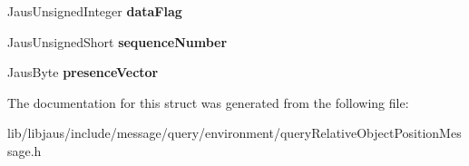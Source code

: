 \begin{DoxyCompactItemize}
\item 
\hypertarget{struct_query_relative_object_position_message_struct_aaec25be55b8853ae277a2967c1438698}{\-Jaus\-Unsigned\-Integer {\bfseries data\-Flag}}\label{struct_query_relative_object_position_message_struct_aaec25be55b8853ae277a2967c1438698}

\item 
\hypertarget{struct_query_relative_object_position_message_struct_ac7a308834dbec50d3d67a217992fe75c}{\-Jaus\-Unsigned\-Short {\bfseries sequence\-Number}}\label{struct_query_relative_object_position_message_struct_ac7a308834dbec50d3d67a217992fe75c}

\item 
\hypertarget{struct_query_relative_object_position_message_struct_af70f070a336997c5595e2ce4a4e8a13d}{\-Jaus\-Byte {\bfseries presence\-Vector}}\label{struct_query_relative_object_position_message_struct_af70f070a336997c5595e2ce4a4e8a13d}

\end{DoxyCompactItemize}


\-The documentation for this struct was generated from the following file\-:\begin{DoxyCompactItemize}
\item 
lib/libjaus/include/message/query/environment/query\-Relative\-Object\-Position\-Message.\-h\end{DoxyCompactItemize}
